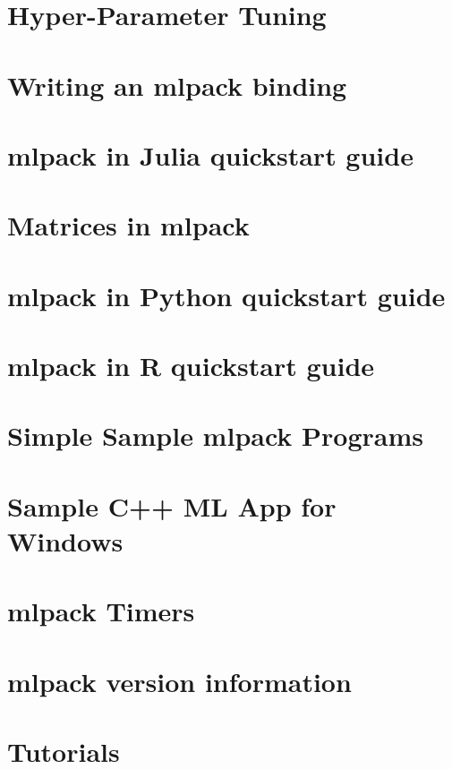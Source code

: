 \documentclass[twoside]{book}
\newcommand{\+}{\discretionary{\mbox{\scriptsize$\hookleftarrow$}}{}{}}
\begin{document}
\chapter{Hyper-\/\+Parameter Tuning}
\label{hpt_guide}

\chapter{Writing an mlpack binding}
\label{iodoc}

\chapter{mlpack in Julia quickstart guide}
\label{julia_quickstart}

\chapter{Matrices in mlpack}
\label{matrices}

\chapter{mlpack in Python quickstart guide}
\label{python_quickstart}

\chapter{mlpack in R quickstart guide}
\label{r_quickstart}

\chapter{Simple Sample mlpack Programs}
\label{sample}

\chapter{Sample C++ ML App for Windows}
\label{sample_ml_app}

\chapter{mlpack Timers}
\label{timer}

\chapter{mlpack version information}
\label{verinfo}

\chapter{Tutorials}
\label{md__home_aakash_mlpack_doc_tutorials_README}

\end{document}
